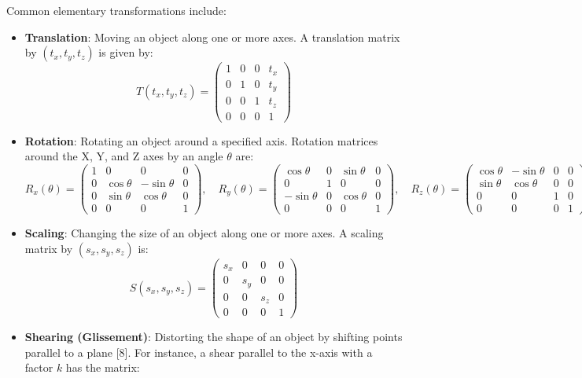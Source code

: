\documentclass[12pt]{article}
\begin{document}
Common elementary transformations include:

\begin{itemize}
    \item \textbf{Translation}: Moving an object along one or more axes. A translation matrix by $(t_x, t_y, t_z)$ is given by:
    \[
    T(t_x, t_y, t_z) = \begin{pmatrix} 1 & 0 & 0 & t_x \\ 0 & 1 & 0 & t_y \\ 0 & 0 & 1 & t_z \\ 0 & 0 & 0 & 1 \end{pmatrix}
    \]
    \item \textbf{Rotation}: Rotating an object around a specified axis. Rotation matrices around the X, Y, and Z axes by an angle $\theta$ are:
    \[
    R_x(\theta) = \begin{pmatrix} 1 & 0 & 0 & 0 \\ 0 & \cos\theta & -\sin\theta & 0 \\ 0 & \sin\theta & \cos\theta & 0 \\ 0 & 0 & 0 & 1 \end{pmatrix}, \quad
    R_y(\theta) = \begin{pmatrix} \cos\theta & 0 & \sin\theta & 0 \\ 0 & 1 & 0 & 0 \\ -\sin\theta & 0 & \cos\theta & 0 \\ 0 & 0 & 0 & 1 \end{pmatrix}, \quad
    R_z(\theta) = \begin{pmatrix} \cos\theta & -\sin\theta & 0 & 0 \\ \sin\theta & \cos\theta & 0 & 0 \\ 0 & 0 & 1 & 0 \\ 0 & 0 & 0 & 1 \end{pmatrix}
    \]
    \item \textbf{Scaling}: Changing the size of an object along one or more axes. A scaling matrix by $(s_x, s_y, s_z)$ is:
    \[
    S(s_x, s_y, s_z) = \begin{pmatrix} s_x & 0 & 0 & 0 \\ 0 & s_y & 0 & 0 \\ 0 & 0 & s_z & 0 \\ 0 & 0 & 0 & 1 \end{pmatrix}
    \]
    \item \textbf{Shearing (Glissement)}: Distorting the shape of an object by shifting points parallel to a plane [8]. For instance, a shear parallel to the x-axis with a factor $k$ has the matrix:

\end{itemize}
\end{document}
